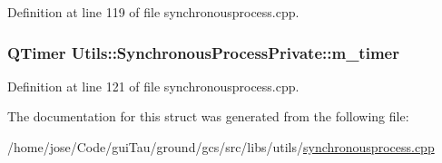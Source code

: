 Definition at line 119 of file synchronousprocess.\-cpp.

\hypertarget{struct_utils_1_1_synchronous_process_private_a3fe987ce5909ead1e57e259369e56178}{
\subsubsection[{m\-\_\-timer}]{\setlength{\rightskip}{0pt plus 5cm}Q\-Timer Utils\-::\-Synchronous\-Process\-Private\-::m\-\_\-timer}}\label{struct_utils_1_1_synchronous_process_private_a3fe987ce5909ead1e57e259369e56178}


Definition at line 121 of file synchronousprocess.\-cpp.



The documentation for this struct was generated from the following file\-:\begin{DoxyCompactItemize}
\item 
/home/jose/\-Code/gui\-Tau/ground/gcs/src/libs/utils/\hyperlink{synchronousprocess_8cpp}{synchronousprocess.\-cpp}\end{DoxyCompactItemize}
